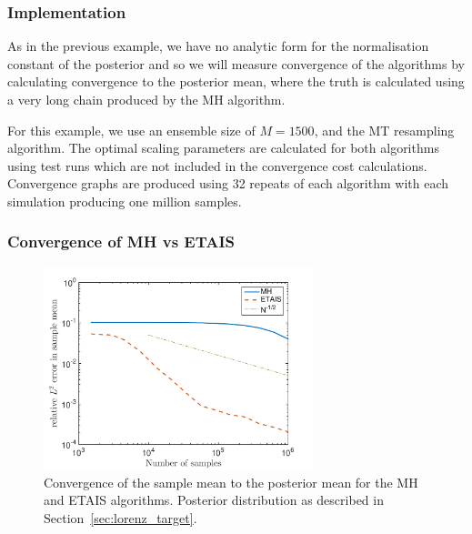 \documentclass[final]{siamltex}
\newcommand{\revised}{}
\begin{document}
\subsubsection{Implementation}\label{sec:lorenz_implementation}

As in the previous example, we have no analytic form for the normalisation constant of the posterior and so we will measure convergence of the algorithms by calculating convergence to the posterior mean, where the truth is calculated using a very long chain produced by the MH algorithm.

For this example, we use an ensemble size of {\revised $M=1500$}, and the MT resampling algorithm. The optimal scaling parameters are calculated for both algorithms using test runs which are not included in the convergence cost calculations. Convergence graphs are produced using 32 repeats of each algorithm with each simulation producing one million samples.

\subsubsection{Convergence of MH vs ETAIS}\label{sec:lorenz_conv}




\begin{figure}[htb]
\centering
\includegraphics[width=0.7\textwidth]{"figures/Lorenz_convergence"}
\caption{Convergence of the sample mean to the posterior mean for the MH and ETAIS algorithms. Posterior distribution as described in Section~\ref{sec:lorenz_target}.}
\label{fig:Lorenz_convergence}
\end{figure}
\end{document}
